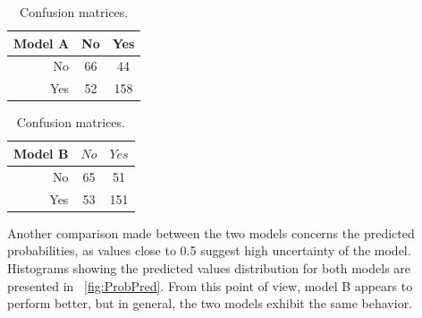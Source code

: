 \begin{table}[H]
	\begin{subtable}[h]{0.4\textwidth}
		\centering
		\begin{tabular}{|| cr | cc ||}    
			\hline
			\multicolumn{2}{|c|}{Model A} 
			& No & Yes \\
			\hline
			& No & 66 & 44 \\
			& Yes & 52 & 158 \\
			\hline
		\end{tabular}
		\caption{}
		\label{table:ConfMatModA}
	\end{subtable}
	\hfill
	\begin{subtable}[h]{0.4\textwidth}
		\centering
		\begin{tabular}{|| cr | cc ||}    
			\hline
			\multicolumn{2}{|c|}{Model B} 
			& $No$ & $Yes$ \\
			\hline
			& No & 65 & 51 \\
			& Yes & 53 & 151 \\
			\hline
		\end{tabular}
		\caption{}
		\label{table:ConfMatModA}
	\end{subtable}
	\caption{Confusion matrices.}
	\label{table:ConfMat}
\end{table}

Another comparison made between the two models concerns the predicted probabilities, as values close to 0.5 suggest high uncertainty of the model. Histograms showing the predicted values distribution for both models are presented in \Fig~\ref{fig:ProbPred}. From this point of view, model B appears to perform better, but in general, the two models exhibit the same behavior.


